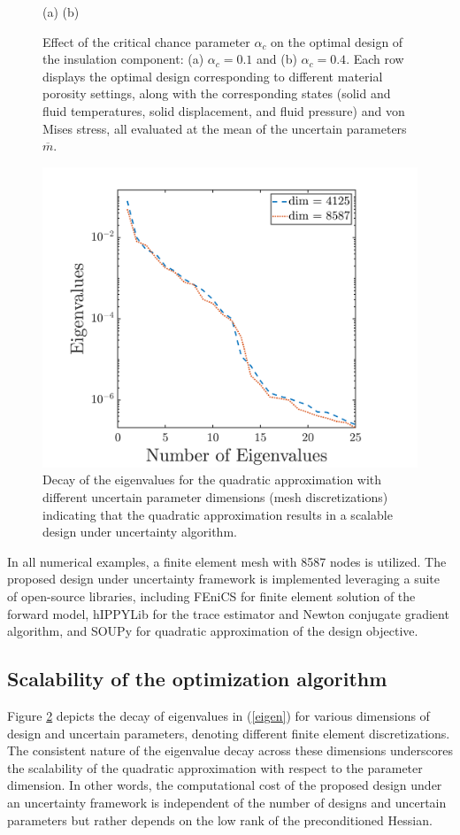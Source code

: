 \documentclass[pdf-a,balance,colorlinks,upint,subscriptcorrection,varvw,mathalfa=cal=boondoxo, spanish,french,vietnamese,russian,greek]{asmeconf}
\begin{document}
\begin{figure}
(a) \hspace{1.25 in} (b)
\caption{
Effect of the critical chance parameter $\alpha_c$ on the optimal design of the insulation component: (a) $\alpha_c=0.1$ and (b) $\alpha_c=0.4$. Each row displays the optimal design corresponding to different material porosity settings, along with the corresponding states (solid and fluid temperatures, solid displacement, and fluid pressure) and von Mises stress, all evaluated at the mean of the uncertain parameters $\overline{m}$.}
\label{fig:chance_result}
\end{figure}


\begin{figure}[h]
\centering
\includegraphics[width=0.8\linewidth]{Figures/Eigenvalue_1.png} 
\caption{Decay of the eigenvalues for the quadratic approximation with different uncertain parameter dimensions (mesh discretizations) indicating that the quadratic approximation results in a scalable design under uncertainty algorithm. \label{fig:eigenvalue}}
\end{figure}
In all numerical examples, a finite element mesh with 8587 nodes is utilized.
The proposed design under uncertainty framework is implemented leveraging a suite of open-source libraries, including FEniCS \cite{fenics} for finite element solution of the forward model, hIPPYLib \cite{VillaPetraGhattas16, VillaPetraGhattas18, VillaPetraGhattas21} for the trace estimator and Newton conjugate gradient algorithm, and SOUPy \cite{peng2022soupy} for quadratic approximation of the design objective.

\subsection{Scalability of the optimization algorithm}
\noindent Figure \ref{fig:eigenvalue} depicts the decay of eigenvalues in (\ref{eigen}) for various dimensions of design and uncertain parameters, denoting different finite element discretizations. The consistent nature of the eigenvalue decay across these dimensions underscores the scalability of the quadratic approximation with respect to the parameter dimension. In other words, the computational cost of the proposed design under an uncertainty framework is independent of the number of designs and uncertain parameters but rather depends on the low rank of the preconditioned Hessian.
\end{document}
